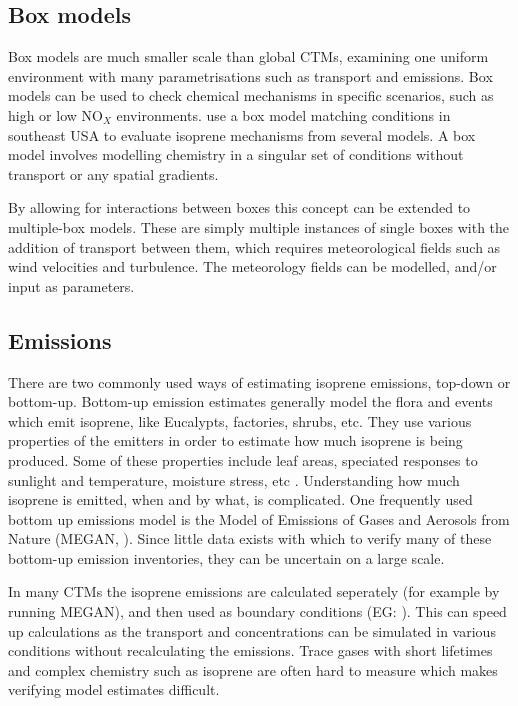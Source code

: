   
  \subsection{Box models}
    Box models are much smaller scale than global CTMs, examining one uniform environment with many parametrisations such as transport and emissions.
    Box models can be used to check chemical mechanisms in specific scenarios, such as high or low NO$_X$ environments.
    \textcite{Marvin2017} use a box model matching conditions in southeast USA to evaluate isoprene mechanisms from several models.  
    A box model involves modelling chemistry in a singular set of conditions without transport or any spatial gradients.
    
    By allowing for interactions between boxes this concept can be extended to multiple-box models.
    These are simply multiple instances of single boxes with the addition of transport between them, which requires meteorological fields such as wind velocities and turbulence.
    The meteorology fields can be modelled, and/or input as parameters.
  
  
  \subsection{Emissions}
  
    There are two commonly used ways of estimating isoprene emissions, top-down or bottom-up.
    Bottom-up emission estimates generally model the flora and events which emit isoprene, like Eucalypts, factories, shrubs, etc.
    They use various properties of the emitters in order to estimate how much isoprene is being produced.
    Some of these properties include leaf areas, speciated responses to sunlight and temperature, moisture stress, etc \parencite{Guenther1995,Guenther2006}.
    Understanding how much isoprene is emitted, when and by what, is complicated.
    One frequently used bottom up emissions model is the Model of Emissions of Gases and Aerosols from Nature (MEGAN, \textcite{Guenther1995}).
    Since little data exists with which to verify many of these bottom-up emission inventories, they can be uncertain on a large scale.
    
    In many CTMs the isoprene emissions are calculated seperately (for example by running MEGAN), and then used as boundary conditions (EG: \textcite{Guenther2006}). 
    This can speed up calculations as the transport and concentrations can be simulated in various conditions without recalculating the emissions.
    Trace gases with short lifetimes and complex chemistry such as isoprene are often hard to measure which makes verifying model estimates difficult.
    
